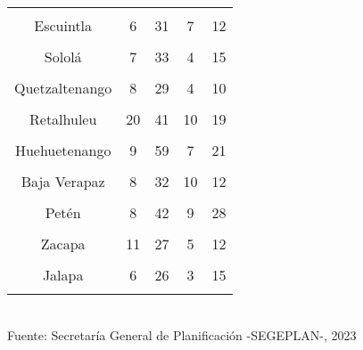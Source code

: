 \begin{tabular}[t]{ccccc}
\cellcolor[HTML]{B6B3FF}{Chimaltenango} & \cellcolor[HTML]{B6B3FF}{10} & \cellcolor[HTML]{B6B3FF}{35} & \cellcolor[HTML]{B6B3FF}{11} & \cellcolor[HTML]{B6B3FF}{13}\\
Escuintla & 6 & 31 & 7 & 12\\
\cellcolor[HTML]{B6B3FF}{Santa Rosa} & \cellcolor[HTML]{B6B3FF}{5} & \cellcolor[HTML]{B6B3FF}{36} & \cellcolor[HTML]{B6B3FF}{5} & \cellcolor[HTML]{B6B3FF}{14}\\
Sololá & 7 & 33 & 4 & 15\\
\cellcolor[HTML]{B6B3FF}{Totonicapán} & \cellcolor[HTML]{B6B3FF}{3} & \cellcolor[HTML]{B6B3FF}{36} & \cellcolor[HTML]{B6B3FF}{6} & \cellcolor[HTML]{B6B3FF}{12}\\
Quetzaltenango & 8 & 29 & 4 & 10\\
\cellcolor[HTML]{B6B3FF}{Suchitepéquez} & \cellcolor[HTML]{B6B3FF}{14} & \cellcolor[HTML]{B6B3FF}{53} & \cellcolor[HTML]{B6B3FF}{15} & \cellcolor[HTML]{B6B3FF}{21}\\
Retalhuleu & 20 & 41 & 10 & 19\\
\cellcolor[HTML]{B6B3FF}{San Marcos} & \cellcolor[HTML]{B6B3FF}{5} & \cellcolor[HTML]{B6B3FF}{52} & \cellcolor[HTML]{B6B3FF}{2} & \cellcolor[HTML]{B6B3FF}{19}\\
Huehuetenango & 9 & 59 & 7 & 21\\
\cellcolor[HTML]{B6B3FF}{Quiché} & \cellcolor[HTML]{B6B3FF}{7} & \cellcolor[HTML]{B6B3FF}{42} & \cellcolor[HTML]{B6B3FF}{6} & \cellcolor[HTML]{B6B3FF}{19}\\
Baja Verapaz & 8 & 32 & 10 & 12\\
\cellcolor[HTML]{B6B3FF}{Alta Verapaz} & \cellcolor[HTML]{B6B3FF}{7} & \cellcolor[HTML]{B6B3FF}{36} & \cellcolor[HTML]{B6B3FF}{4} & \cellcolor[HTML]{B6B3FF}{17}\\
Petén & 8 & 42 & 9 & 28\\
\cellcolor[HTML]{B6B3FF}{Izabal} & \cellcolor[HTML]{B6B3FF}{8} & \cellcolor[HTML]{B6B3FF}{24} & \cellcolor[HTML]{B6B3FF}{7} & \cellcolor[HTML]{B6B3FF}{14}\\
Zacapa & 11 & 27 & 5 & 12\\
\cellcolor[HTML]{B6B3FF}{Chiquimula} & \cellcolor[HTML]{B6B3FF}{10} & \cellcolor[HTML]{B6B3FF}{27} & \cellcolor[HTML]{B6B3FF}{3} & \cellcolor[HTML]{B6B3FF}{15}\\
Jalapa & 6 & 26 & 3 & 15\\
\cellcolor[HTML]{B6B3FF}{Jutiapa} & \cellcolor[HTML]{B6B3FF}{8} & \cellcolor[HTML]{B6B3FF}{35} & \cellcolor[HTML]{B6B3FF}{4} & \cellcolor[HTML]{B6B3FF}{14}\\
\bottomrule
\end{tabular}
\\[0.5cm]
Fuente: Secretaría General de Planificación -SEGEPLAN-, 2023
